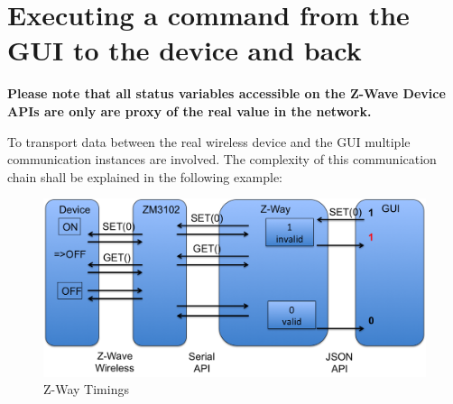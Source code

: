 \section{Executing a command from the GUI to the device and back}

\textbf{Please note that all status variables accessible on the Z-Wave Device APIs
are only are proxy of the real value in the network.}

To transport data between the real wireless device and the GUI multiple communication 
instances are involved. The complexity of this communication chain shall be 
explained in the following example:

\begin{figure} 
\begin{center}
\includegraphics[scale=0.6]{pics/zway2en.png}
\caption{Z-Way Timings}
\label{zwaytimings} 
\end{center} 
\end{figure}

